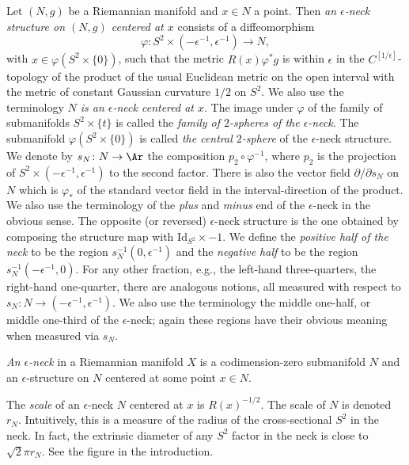 \begin{definition}
\label{def:epsilon-neck}
\label{epsneck}
Let $(N,g)$ be a Riemannian manifold and $x\in N$ a point. Then {\em
an $\epsilon$-neck structure on $(N,g)$
centered at $x$} consists of a diffeomorphism
$$\varphi\colon S^2\times (-\epsilon^{-1},\epsilon^{-1})\to N,$$
with $x\in \varphi(S^2\times\{0\})$, such that the metric
$R(x)\varphi^*g$ is within $\epsilon$ in the
$C^{[1/\epsilon]}$-topology of the product of the usual Euclidean
metric on the open interval with the metric of constant Gaussian
curvature $1/2$ on $S^2$. We also use the terminology {\em $N$ is an
$\epsilon$-neck centered at $x$}. The image under $\varphi$ of the
family of submanifolds $S^2\times \{t\}$ is called the {\em family
of $2$-spheres of the $\epsilon$-neck}. The submanifold
$\varphi(S^2\times \{0\})$ is called {\em the central $2$-sphere} of
the $\epsilon$-neck structure. We denote by $s_N\colon N\to \Ar$
the composition $p_2\circ \varphi^{-1}$, where $p_2$ is the
projection of $S^2\times (-\epsilon^{-1},\epsilon^{-1})$ to the
second factor. There is also the vector field $\partial/\partial
s_N$ on $N$ which is $\varphi_*$ of the standard vector field in the
interval-direction of the product. We also use the terminology of
the {\em plus} and {\em minus} end of the $\epsilon$-neck in the
obvious sense. The opposite (or reversed) $\epsilon$-neck structure
is the one obtained by composing the structure map with $\mathrm{Id}_{S^2}\times -1$. We define the
{\em positive half of the neck} to be the region
$s_N^{-1}(0,\epsilon^{-1})$ and the {\em negative half} to be the
region $s_N^{-1} (-\epsilon^{-1},0)$. For any other fraction, e.g.,
the left-hand three-quarters, the right-hand one-quarter, there are
analogous notions, all measured with respect to $s_N\colon N\to
(-\epsilon^{-1},\epsilon^{-1})$. We also use the terminology the
middle one-half, or middle one-third of the $\epsilon$-neck; again
these regions have their obvious meaning when measured via $s_N$.


{\em An $\epsilon$-neck} in a Riemannian manifold $X$ is a
codimension-zero submanifold $N$ and an $\epsilon$-structure on $N$
centered at some point $x\in N$.

The {\em scale} of an $\epsilon$-neck $N$ centered
at $x$ is $R(x)^{-1/2}$. The scale of $N$ is denoted $r_N$. Intuitively, this
is a measure of the radius of the cross-sectional $S^2$ in the neck. In fact,
the extrinsic diameter of any $S^2$ factor in the neck is close to $\sqrt{2}\pi
r_N$. See the figure in the introduction.
\end{definition}



